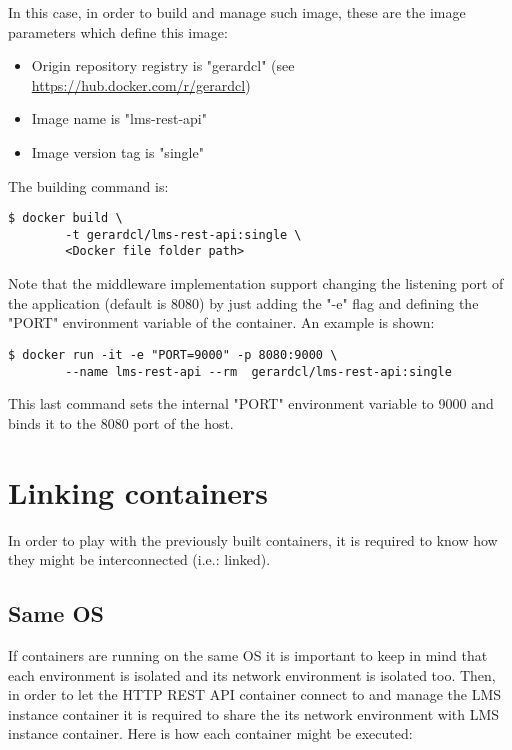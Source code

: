 In this case, in order to build and manage such image, these are the image parameters which define this image:

\begin{itemize}
\item Origin repository registry is "gerardcl" (see \url{https://hub.docker.com/r/gerardcl})
\item Image name is "lms-rest-api"
\item Image version tag is "single"
\end{itemize}

The building command is:

\begin{verbatim}
$ docker build \
		-t gerardcl/lms-rest-api:single \
		<Docker file folder path>
\end{verbatim}

Note that the middleware implementation support changing the listening port of the application (default is 8080) by just adding the "-e" flag and defining the "PORT" environment variable of the container. An example is shown:

\begin{verbatim}
$ docker run -it -e "PORT=9000" -p 8080:9000 \
		--name lms-rest-api --rm  gerardcl/lms-rest-api:single
\end{verbatim}

This last command sets the internal "PORT" environment variable to 9000 and binds it to the 8080 port of the host.

\section{Linking containers}

In order to play with the previously built containers, it is required to know how they might be interconnected (i.e.: linked).

\subsection{Same OS}

If containers are running on the same OS it is important to keep in mind that each environment is isolated and its network environment is isolated too. Then, in order to let the HTTP REST API container connect to and manage the LMS instance container it is required to share the its network environment with LMS instance container. Here is how each container might be executed:

